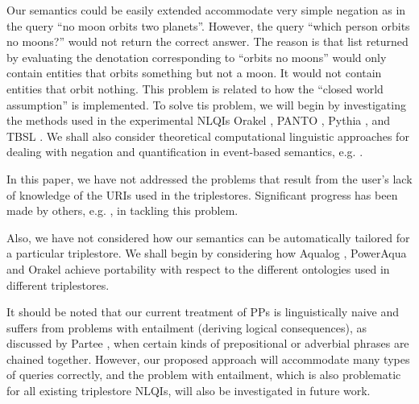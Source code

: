 \documentclass[../main.tex]{subfiles}
\begin{document}
\begin{refsection}
Our semantics could be easily extended accommodate very simple negation as in the query ``no moon orbits two planets''. However, the query ``which person orbits no moons?'' would not return the correct answer. The reason is that list returned by evaluating the denotation corresponding to ``orbits no moons'' would only contain entities that orbits something but not a moon. It would not contain entities that orbit nothing. This problem is related to how the ``closed world assumption'' is implemented. To solve tis problem, we will begin by investigating the methods used in the experimental NLQIs Orakel \cite{cimiano:haase}, PANTO \cite{wang2007panto}, Pythia \cite{unger:cimiano}, and TBSL \cite{hoffner2013user}. We shall also consider theoretical computational linguistic approaches for dealing with negation and quantification in event-based semantics, e.g. \cite{champollion2010quantification}.

In this paper, we have not addressed the problems that result from the user's lack of knowledge of the URIs used in the triplestores. Significant progress has been made by others, e.g. \cite{walter:unger}, in tackling this problem.

Also, we have not considered how our semantics can be automatically tailored for a particular triplestore. We shall begin by considering how Aqualog \cite{lopez:aqualog}, PowerAqua \cite{lopez:2012} and Orakel \cite{cimiano:haase} achieve portability with respect to the different ontologies used in different triplestores.

It should be noted that our current treatment of PPs is linguistically naive and suffers from problems with entailment (deriving logical consequences), as discussed by Partee \cite{partee2005formal}, when certain kinds of prepositional or adverbial phrases are chained together. However, our proposed approach will accommodate many types of queries correctly, and the problem with entailment, which is also problematic for all existing triplestore NLQIs, will also be investigated in future work.


\end{refsection}
\end{document}
